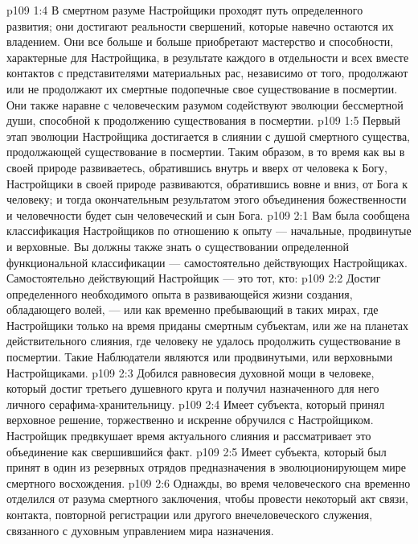 \vs p109 1:4 В смертном разуме Настройщики проходят путь определенного развития; они достигают реальности свершений, которые навечно остаются их владением. Они все больше и больше приобретают мастерство и способности, характерные для Настройщика, в результате каждого в отдельности и всех вместе контактов с представителями материальных рас, независимо от того, продолжают или не продолжают их смертные подопечные свое существование в посмертии. Они также наравне с человеческим разумом содействуют эволюции бессмертной души, способной к продолжению существования в посмертии.
\vs p109 1:5 Первый этап эволюции Настройщика достигается в слиянии с душой смертного существа, продолжающей существование в посмертии. Таким образом, в то время как вы в своей природе развиваетесь, обратившись внутрь и вверх от человека к Богу, Настройщики в своей природе развиваются, обратившись вовне и вниз, от Бога к человеку; и тогда окончательным результатом этого объединения божественности и человечности будет сын человеческий и сын Бога.
\vs p109 2:1 Вам была сообщена классификация Настройщиков по отношению к опыту --- начальные, продвинутые и верховные. Вы должны также знать о существовании определенной функциональной классификации --- самостоятельно действующих Настройщиках. Самостоятельно действующий Настройщик --- это тот, кто:
\vs p109 2:2 \pc {}\bibnobreakspace Достиг определенного необходимого опыта в развивающейся жизни создания, обладающего волей, --- или как временно пребывающий в таких мирах, где Настройщики только на время приданы смертным субъектам, или же на планетах действительного слияния, где человеку не удалось продолжить существование в посмертии. Такие Наблюдатели являются или продвинутыми, или верховными Настройщиками.
\vs p109 2:3 \bibnobreakspace Добился равновесия духовной мощи в человеке, который достиг третьего душевного круга и получил назначенного для него личного серафима\hyp{}хранительницу.
\vs p109 2:4 \pc {}\bibnobreakspace Имеет субъекта, который принял верховное решение, торжественно и искренне обручился с Настройщиком. Настройщик предвкушает время актуального слияния и рассматривает это объединение как свершившийся факт.
\vs p109 2:5 \pc {}\bibnobreakspace Имеет субъекта, который был принят в один из резервных отрядов предназначения в эволюционирующем мире смертного восхождения.
\vs p109 2:6 \pc {}\bibnobreakspace Однажды, во время человеческого сна временно отделился от разума смертного заключения, чтобы провести некоторый акт связи, контакта, повторной регистрации или другого внечеловеческого служения, связанного с духовным управлением мира назначения.
